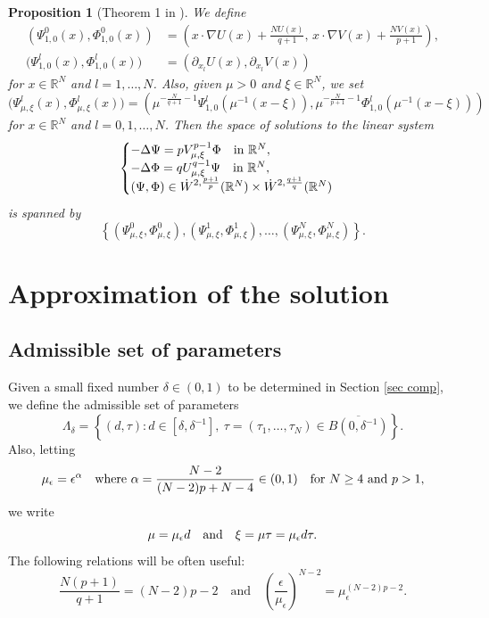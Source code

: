 \documentclass[reqno]{amsart}
\newtheorem{proposition}[theorem]{Proposition}
\theoremstyle{remark}
\newcommand{\pa}{\partial}
\newcommand{\ep}{\epsilon}
\newcommand{\R}{\mathbb{R}}
\newcommand{\mx}{{\mu,\xi}}
\renewcommand{\(}{\left(}
\renewcommand{\)}{\right)}
\numberwithin{equation}{section}
\begin{document}
\begin{proposition}[Theorem 1 in \cite{FKP}]\label{nondeg}
We define
\begin{equation}\label{PsPhmxl10}
\begin{aligned}
\(\Psi_{1,0}^0(x),\Phi_{1,0}^0(x)\) &= \(x \cdot \nabla U(x) + \frac{NU(x)}{q+1},\, x \cdot \nabla V(x) + \frac{NV(x)}{p+1}\),\\
\big(\Psi_{1,0}^l(x),\Phi_{1,0}^l(x)\big) &= \(\pa_{x_l}U(x), \pa_{x_l}V(x)\)
\end{aligned}
\end{equation}
for $x \in \R^N$ and $l = 1,\ldots,N$. Also, given $\mu > 0$ and $\xi \in \R^N$, we set
\begin{equation}\label{PsPhmxl}
\big(\Psi_\mx^l(x), \Phi_\mx^l(x)\big) = \(\mu^{-\frac{N}{q+1}-1} \Psi_{1,0}^l (\mu^{-1}(x-\xi)), \mu^{-\frac{N}{p+1}-1} \Phi_{1,0}^l (\mu^{-1}(x-\xi))\)
\end{equation}
for $x \in \R^N$ and $l = 0,1,\ldots,N$. Then the space of solutions to the linear system
\[\begin{cases}
-\Delta \Psi = pV_\mx^{p-1} \Phi \quad \textup{in } \R^N,\\
-\Delta \Phi = qU_\mx^{q-1} \Psi \quad \textup{in } \R^N,\\
(\Psi,\Phi) \in \dot{W}^{2,\frac{p+1}{p}}(\R^N) \times \dot{W}^{2,\frac{q+1}{q}}(\R^N)
\end{cases}\]
is spanned by
\[\left\{\(\Psi_\mx^0, \Phi_\mx^0\), \(\Psi_\mx^1,\Phi_\mx^1\), \ldots, \(\Psi_\mx^N,\Phi_\mx^N\)\right\}.\]
\end{proposition}



\section{Approximation of the solution}\label{sec app}
\subsection{Admissible set of parameters}
Given a small fixed number $\delta \in (0,1)$ to be determined in Section \ref{sec comp}, we define the admissible set of parameters
\begin{equation}\label{Lambda delta}
\Lambda_\delta = \left\{(d,\tau): d\in [\delta,\delta^{-1}],\ \tau = (\tau_1,\ldots,\tau_N) \in \overline{B(0,\delta^{-1})}\right\}.
\end{equation}
Also, letting
\begin{equation}\label{mu ep}
\mu_\ep = \ep^\alpha \quad \textup{where } \alpha = \frac{N-2}{(N-2)p+N-4} \in (0,1) \quad \textup{for } N \ge 4 \textup{ and } p > 1,
\end{equation}
we write
\begin{equation}\label{trans and scaling}
\mu = \mu_\ep d \quad \textup{and} \quad \xi = \mu\tau = \mu_\ep d\tau.
\end{equation}
The following relations will be often useful:
\begin{equation}\label{simple rel}
\frac{N(p+1)}{q+1}=(N-2)p-2 \quad \text{and} \quad \(\frac{\ep}{\mu_\ep}\)^{N-2} = \mu_\ep^{(N-2)p-2}.
\end{equation}
\end{document}
